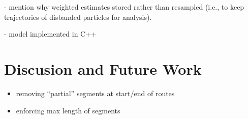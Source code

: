 \documentclass[draftcls,a4paper,onecolumn]{IEEEtran}\usepackage[]{graphicx}\usepackage[]{color}
\begin{document}
- mention why weighted estimates stored rather than resampled 
(i.e., to keep trajectories of disbanded particles for analysis).

- model implemented in C++


\section{Discusion and Future Work}
\label{sec:discussion}

\begin{itemize}
\item removing ``partial'' segments at start/end of routes
\item enforcing max length of segments
\end{itemize}





\end{document}

